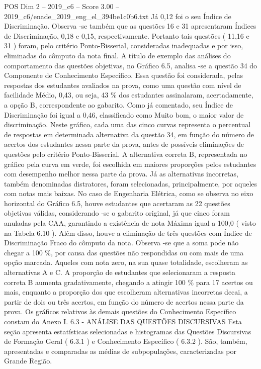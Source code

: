\begin{textsample}{POS Dim 2 – 2019\_c6 – Score 3.00 – 2019\_c6/enade\_2019\_eng\_el\_394be1c0b6.txt}
Já 0,12 foi o seu Índice de Discriminação.
Observa -se também que as questões 16 e 31 apresentaram Índices de Discriminação, 0,18 e 0,15, respectivamente.
Portanto tais questões ( 11,16 e 31 ) foram, pelo critério Ponto-Bisserial, consideradas inadequadas e por isso, eliminadas do cômputo da nota final.
A título de exemplo das análises do comportamento das questões objetivas, no Gráfico 6.5, analisa -se a questão 34 do Componente de Conhecimento Específico.
Essa questão foi considerada, pelas respostas dos estudantes avaliados na prova, como uma questão com nível de facilidade Médio, 0,43, ou seja, 43 \% dos estudantes assinalaram, acertadamente, a opção B, correspondente ao gabarito.
Como já comentado, seu Índice de Discriminação foi igual a 0,46, classificado como Muito bom, o maior valor de discriminação.
Neste gráfico, cada uma das cinco curvas representa o percentual de respostas em determinada alternativa da questão 34, em função do número de acertos dos estudantes nessa parte da prova, antes de possíveis eliminações de questões pelo critério Ponto-Bisserial.
A alternativa correta B, representada no gráfico pela curva em verde, foi escolhida em maiores proporções pelos estudantes com desempenho melhor nessa parte da prova.
Já as alternativas incorretas, também denominadas distratores, foram selecionadas, principalmente, por aqueles com notas mais baixas.
No caso de Engenharia Elétrica, como se observa no eixo horizontal do Gráfico 6.5, houve estudantes que acertaram as 22 questões objetivas válidas, considerando -se o gabarito original, já que cinco foram anuladas pela CAA, garantindo a existência de nota Máxima igual a 100,0 ( visto na Tabela 6.10 ).
Além disso, houve a eliminação de três questões com Índice de Discriminação Fraco do cômputo da nota.
Observa -se que a soma pode não chegar a 100 \%, por causa das questões não respondidas ou com mais de uma opção marcada.
Aqueles com nota zero, na sua quase totalidade, escolheram as alternativas A e C.
A proporção de estudantes que selecionaram a resposta correta B aumenta gradativamente, chegando a atingir 100 \% para 17 acertos ou mais, enquanto a proporção dos que escolheram alternativas incorretas decai, a partir de dois ou três acertos, em função do número de acertos nessa parte da prova.
Os gráficos relativos às demais questões do Conhecimento Específico constam do Anexo I. 6.3 - ANÁLISE DAS QUESTÕES DISCURSIVAS Esta seção apresenta estatísticas selecionadas e histogramas das Questões Discursivas de Formação Geral ( 6.3.1 ) e Conhecimento Específico ( 6.3.2 ).
São, também, apresentadas e comparadas as médias de subpopulações, caracterizadas por Grande Região.

\end{textsample}
